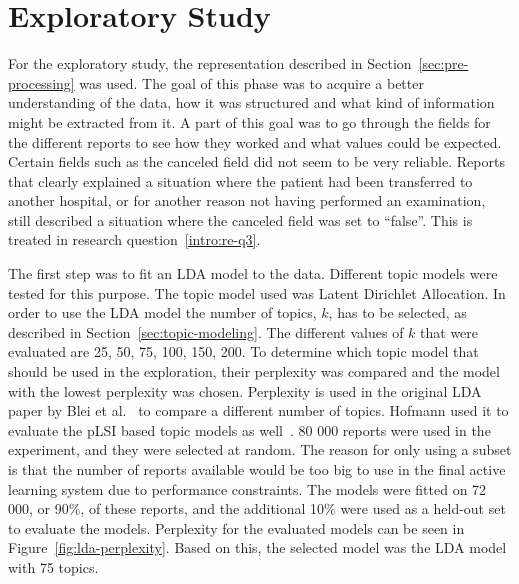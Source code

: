 \section{Exploratory Study}\label{sec:exploratory-study}

For the exploratory study, the representation described in Section~\ref{sec:pre-processing} was used.
The goal of this phase was to acquire a better understanding of the data, how it was structured and what kind of information might be extracted from it.
A part of this goal was to go through the fields for the different reports to see how they worked and what values could be expected.
Certain fields such as the canceled field did not seem to be very reliable. 
Reports that clearly explained a situation where the patient had been transferred to another hospital, or for another reason not having performed an examination, still described a situation where the canceled field was set to ``false''.
This is treated in research question~\ref{intro:re-q3}.

The first step was to fit an LDA model to the data.
Different topic models were tested for this purpose.
The topic model used was Latent Dirichlet Allocation.
In order to use the LDA model the number of topics, $k$, has to be selected, as described in Section~\ref{sec:topic-modeling}.
The different values of $k$ that were evaluated are 25, 50, 75, 100, 150, 200.
To determine which topic model that should be used in the exploration, their perplexity was compared and the model with the lowest perplexity was chosen.
Perplexity is used in the original LDA paper by Blei et al\@.~\cite{blei2003latent} to compare a different number of topics.
Hofmann used it to evaluate the pLSI based topic models as well~\cite{hofmann1999probabilistic}.
80 000 reports were used in the experiment, and they were selected at random.
The reason for only using a subset is that the number of reports available would be too big to use in the final active learning system due to performance constraints.
The models were fitted on 72 000, or 90\%, of these reports, and the additional 10\% were used as a held-out set to evaluate the models.
Perplexity for the evaluated models can be seen in Figure~\ref{fig:lda-perplexity}.
Based on this, the selected model was the LDA model with 75 topics.

